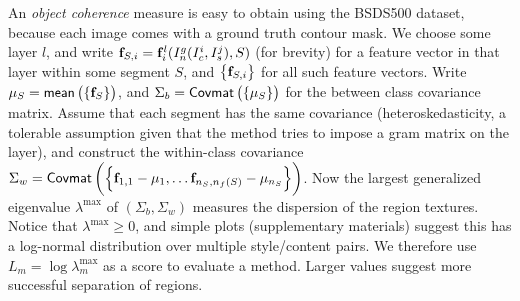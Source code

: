 \documentclass[runningheads]{llncs}
\newcommand{\vect}[1]{{\bf {#1}}}
\begin{document}
An \textit{object coherence} measure is easy to obtain using the BSDS500 dataset, because each image comes with a ground truth contour
mask.  We choose some layer $l$, and write $\vect{f}_{S,i}=\vect{f}_{i}^{l}(I^g_n(I_c^i,I_s^j), S)$ (for brevity) for a feature
vector in that layer within some segment $S$, and $\left\{\vect{f}_{S,i}\right\}$ for all such feature
vectors.  Write $\mu_S=\mean{\vect{f}_S}$, and $\Sigma_b={ {\small {\mathsf{Covmat}} \left( \left\{ {{\mu_S}} \right\} \right) }}$ for the between class covariance matrix.
Assume that each segment has the same covariance (heteroskedasticity,
a tolerable assumption given that the method tries to impose a gram matrix on the layer), and construct the within-class
covariance $\Sigma_w=\covmat{\vect{f}_{1,1}-\mu_1, \ldots \vect{f}_{n_S,n_f(S)}-\mu_{n_S}}$.  Now the
largest generalized eigenvalue $\lambda^{\mbox{max}}$ of $(\Sigma_b, \Sigma_w)$ measures the dispersion of the region
textures.   Notice that $\lambda^{\mbox{max}}\geq 0$, and simple plots (supplementary materials) suggest this has a
log-normal distribution over multiple style/content pairs.  We therefore use $L_m=\log \lambda^{\mbox{max}}_{m}$ as a
score to evaluate a method.  Larger values suggest more successful separation of regions.
\end{document}
